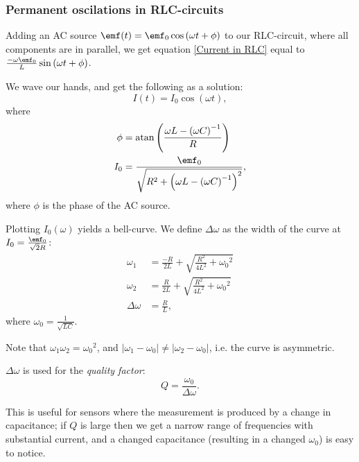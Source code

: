 \documentclass[a4paper, 12pt]{article}
\begin{document}
        \subsubsection{Permanent oscilations in RLC-circuits}

            Adding an AC source $\emf(t) = \emf_0\cos\left(\omega t + \phi\right)$ to our RLC-circuit, where all components are in parallel, 
            we get equation \ref{Current in RLC} equal to $\frac{-\omega\emf_0}{L}\sin\left(\omega t + \phi\right)$.
            
            We wave our hands, and get the following as a solution: 
            \begin{equation}
                I(t) = I_0 \cos\left(\omega t\right),
            \end{equation}
            where 
            \begin{align*}
                \phi &= \text{atan} \left(\frac{\omega L - \left(\omega C\right)^{-1}}{R}\right)\\
                I_0 &= \frac{\emf_0}{\sqrt{R^2 + \left(\omega L - \left(\omega C\right)^{-1}\right)^2}},
            \end{align*}
            where $\phi$ is the phase of the AC source.

            Plotting $I_0(\omega)$ yields a bell-curve. We define $\Delta\omega$ as the width of the curve at $I_0 = \frac{\emf_0}{\sqrt{2}R}$: 
            \begin{align*}
                \omega_1 &= \frac{-R}{2L} + \sqrt{\frac{R^2}{4L^2} + {\omega_0}^2}\\
                \omega_2 &= \frac{R}{2L} + \sqrt{\frac{R^2}{4L^2} + {\omega_0}^2}\\
                \Delta\omega &= \frac{R}{L},
            \end{align*}
            where $\omega_0 = \frac{1}{\sqrt{LC}}$.

            Note that $\omega_1\omega_2={\omega_0}^2$, and $|\omega_1 - \omega_0| \neq |\omega_2 - \omega_0|$, i.e. the curve is asymmetric.

            $\Delta\omega$ is used for the \textit{quality factor}:
            \begin{equation}
                Q = \frac{\omega_0}{\Delta\omega}.
            \end{equation}

            This is useful for sensors where the measurement is produced by a change in capacitance; 
            if $Q$ is large then we get a narrow range of frequencies with substantial current, and a changed capacitance 
            (resulting in a changed $\omega_0$) is easy to notice. 
\end{document}
